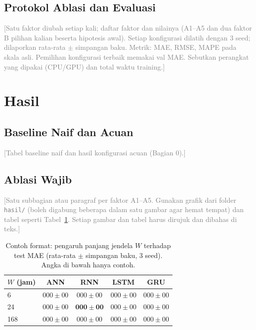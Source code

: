 \documentclass[conference,a4paper]{IEEEtran}
\newcommand{\petunjuk}[1]{\textcolor{gray}{[#1]}}
\begin{document}
\subsection{Protokol Ablasi dan Evaluasi}
\petunjuk{Satu faktor diubah setiap kali; daftar faktor dan nilainya (A1--A5 dan dua faktor B pilihan kalian beserta hipotesis awal). Setiap konfigurasi dilatih dengan 3 seed; dilaporkan rata-rata $\pm$ simpangan baku. Metrik: MAE, RMSE, MAPE pada skala asli. Pemilihan konfigurasi terbaik memakai val MAE. Sebutkan perangkat yang dipakai (CPU/GPU) dan total waktu training.}

\section{Hasil}

\subsection{Baseline Naif dan Acuan}
\petunjuk{Tabel baseline naif dan hasil konfigurasi acuan (Bagian 0).}

\subsection{Ablasi Wajib}
\petunjuk{Satu subbagian atau paragraf per faktor A1--A5. Gunakan grafik dari folder \texttt{hasil/} (boleh digabung beberapa dalam satu gambar agar hemat tempat) dan tabel seperti Tabel~\ref{tab:contoh}. Setiap gambar dan tabel harus dirujuk dan dibahas di teks.}

\begin{table}[t]
  \centering
  \caption{Contoh format: pengaruh panjang jendela $W$ terhadap test MAE (rata-rata $\pm$ simpangan baku, 3 seed). Angka di bawah hanya contoh.}
  \label{tab:contoh}
  \begin{tabular}{@{}lcccc@{}}
    \toprule
    $W$ (jam) & ANN & RNN & LSTM & GRU \\
    \midrule
    6   & $000 \pm 00$ & $000 \pm 00$ & $000 \pm 00$ & $000 \pm 00$ \\
    24  & $000 \pm 00$ & $\mathbf{000 \pm 00}$ & $000 \pm 00$ & $000 \pm 00$ \\
    168 & $000 \pm 00$ & $000 \pm 00$ & $000 \pm 00$ & $000 \pm 00$ \\
    \bottomrule
  \end{tabular}
\end{table}
\end{document}
